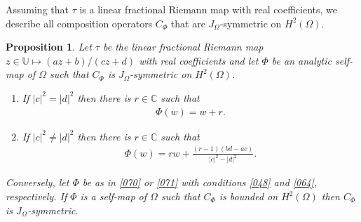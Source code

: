 \documentclass[11pt]{amsart}%
\newtheorem{pps}[thm]{Proposition}
\theoremstyle{definition}
\theoremstyle{remark}
\numberwithin{equation}{section}
\begin{document}


Assuming that $\tau$ is a linear fractional Riemann map with real
coefficients, we describe all composition operators $C_{\Phi}$ that
are $J_{\Omega}$-symmetric on $H^{2}(\Omega).$

\begin{pps}
\label{063} Let $\tau$ be the linear fractional Riemann map $z\in \mathbb{U} \mapsto (az+b)/(cz+d)$ with real
coefficients  and let $\Phi$ be an analytic self-map of $\Omega$ such
that $C_{\Phi}$ is $J_{\Omega}$-symmetric on $H^{2}(\Omega) $.

\begin{enumerate}
\item \label{048} If $|c|^{2}=|d|^{2}$ then there is $r\in\mathbb{C}$ such
that
\begin{align}
\label{070}\Phi(w)=w+r.
\end{align}


\item \label{064} If $|c|^{2}\neq|d|^{2}$ then there is $r \in\mathbb{C}$ such
that
\begin{align}
\label{071}\Phi(w)=r w+\frac{(r-1)(bd-ac)}{|c|^{2}-|d|^{2}}.
\end{align}

\end{enumerate}

Conversely, let $\Phi$ be as in \eqref{070} or \eqref{071} with conditions
\eqref{048} and \eqref{064}, respectively. If $\Phi$ is a self-map
of $\Omega$ such that $C_{\Phi}$ is bounded on $H^{2}(\Omega)$ then $C_{\Phi}$
is $J_{\Omega}$-symmetric.
\end{pps}
\end{document}
